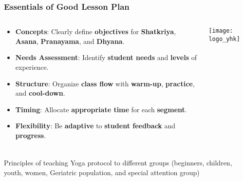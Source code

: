 \begin{frame}[fragile]\frametitle{Essentials of Good Lesson Plan}
\begin{columns}
    \begin{column}[T]{0.5\linewidth}
      \begin{itemize}
        \item \textbf{Concepts}: Clearly define \textbf{objectives} for \textbf{Shatkriya}, \textbf{Asana}, \textbf{Pranayama}, and \textbf{Dhyana}.
        \item \textbf{Needs Assessment}: Identify \textbf{student needs} and \textbf{levels} of experience.
        \item \textbf{Structure}: Organize \textbf{class flow} with \textbf{warm-up}, \textbf{practice}, and \textbf{cool-down}.
        \item \textbf{Timing}: Allocate \textbf{appropriate time} for each \textbf{segment}.
        \item \textbf{Flexibility}: Be \textbf{adaptive} to \textbf{student feedback} and \textbf{progress}.
      \end{itemize}
    \end{column}
    \begin{column}[T]{0.5\linewidth}
        \begin{center}
        \texttt{[image: logo\_yhk]}
        \end{center}	
    \end{column}
\end{columns}
\end{frame}


\begin{frame}[fragile]\frametitle{}
\begin{center}
{\Large Principles  of  teaching  Yoga  protocol  to  different  groups  (beginners,  children,  youth, women, Geriatric population, and special attention group)}
\end{center}
\end{frame}

